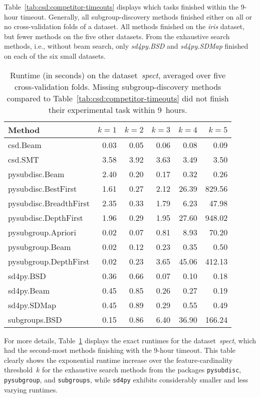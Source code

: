 \documentclass{article}
\begin{document}
Table~\ref{tab:csd:competitor-timeouts} displays which tasks finished within the 9-hour timeout.
Generally, all subgroup-discovery methods finished either on all or no cross-validation folds of a dataset.
All methods finished on the \emph{iris} dataset, but fewer methods on the five other datasets.
From the exhaustive search methods, i.e., without beam search, only \emph{sd4py.BSD} and \emph{sd4py.SDMap} finished on each of the six small datasets.

\begin{table}[ht]
	\centering
	\caption{
		Runtime (in seconds) on the dataset~\emph{spect}, averaged over five cross-validation folds.
		Missing subgroup-discovery methods compared to Table~\ref{tab:csd:competitor-timeouts} did not finish their experimental task within 9~hours.
	}
	\begin{tabular}{lrrrrr}
		\toprule
		Method & $k=1$ & $k=2$ & $k=3$ & $k=4$ & $k=5$ \\
		\midrule
		csd.Beam & 0.03 & 0.05 & 0.06 & 0.08 & 0.09 \\
		csd.SMT & 3.58 & 3.92 & 3.63 & 3.49 & 3.50 \\
		pysubdisc.Beam & 2.40 & 0.20 & 0.17 & 0.32 & 0.26 \\
		pysubdisc.BestFirst & 1.61 & 0.27 & 2.12 & 26.39 & 829.56 \\
		pysubdisc.BreadthFirst & 2.35 & 0.33 & 1.79 & 6.23 & 47.98 \\
		pysubdisc.DepthFirst & 1.96 & 0.29 & 1.95 & 27.60 & 948.02 \\
		pysubgroup.Apriori & 0.02 & 0.07 & 0.81 & 8.93 & 70.20 \\
		pysubgroup.Beam & 0.02 & 0.12 & 0.23 & 0.35 & 0.50 \\
		pysubgroup.DepthFirst & 0.02 & 0.23 & 3.65 & 45.06 & 412.13 \\
		sd4py.BSD & 0.36 & 0.66 & 0.07 & 0.10 & 0.18 \\
		sd4py.Beam & 0.45 & 0.85 & 0.26 & 0.27 & 0.19 \\
		sd4py.SDMap & 0.45 & 0.89 & 0.29 & 0.55 & 0.49 \\
		subgroups.BSD & 0.15 & 0.86 & 6.40 & 36.90 & 166.24 \\
		\bottomrule
	\end{tabular}
	\label{tab:csd:spect-runtime}
\end{table}

For more details, Table~\ref{tab:csd:spect-runtime} displays the exact runtimes for the dataset~\emph{spect}, which had the second-most methods finishing with the 9-hour timeout.
This table clearly shows the exponential runtime increase over the feature-cardinality threshold~$k$ for the exhaustive search methods from the packages \texttt{pysubdisc}, \texttt{pysubgroup}, and \texttt{subgroups}, while \texttt{sd4py} exhibits considerably smaller and less varying runtimes.
\end{document}
